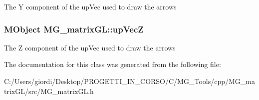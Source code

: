 The Y component of the up\-Vec used to draw the arrows \hypertarget{class_m_g__matrix_g_l_a06ff38ae5efea2c74a4090cca49c4691}{
\subsubsection[{up\-Vec\-Z}]{\setlength{\rightskip}{0pt plus 5cm}M\-Object M\-G\-\_\-matrix\-G\-L\-::up\-Vec\-Z\hspace{0.3cm}{\ttfamily [static]}}}\label{class_m_g__matrix_g_l_a06ff38ae5efea2c74a4090cca49c4691}
The Z component of the up\-Vec used to draw the arrows 

The documentation for this class was generated from the following file\-:\begin{DoxyCompactItemize}
\item 
C\-:/\-Users/giordi/\-Desktop/\-P\-R\-O\-G\-E\-T\-T\-I\-\_\-\-I\-N\-\_\-\-C\-O\-R\-S\-O/\-C/\-M\-G\-\_\-\-Tools/cpp/\-M\-G\-\_\-matrix\-G\-L/src/M\-G\-\_\-matrix\-G\-L.\-h\end{DoxyCompactItemize}
